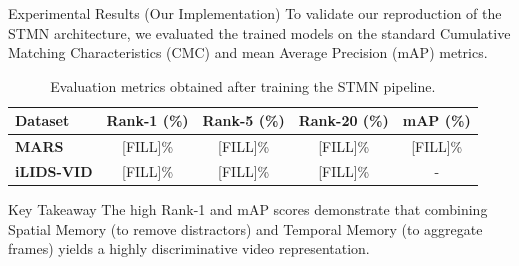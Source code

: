 \begin{frame}{Experimental Results (Our Implementation)}
    \small
    To validate our reproduction of the STMN architecture, we evaluated the trained models on the standard Cumulative Matching Characteristics (CMC) and mean Average Precision (mAP) metrics.
    
    \vspace{1em}
    \begin{table}[]
        \centering
        \renewcommand{\arraystretch}{1.3} %
        \begin{tabular}{@{}lcccc@{}}
            \toprule
            \textbf{Dataset} & \textbf{Rank-1 (\%)} & \textbf{Rank-5 (\%)} & \textbf{Rank-20 (\%)} & \textbf{mAP (\%)} \\
            \midrule
            \textbf{MARS} & [FILL]\% & [FILL]\% & [FILL]\% & [FILL]\% \\
            \textbf{iLIDS-VID} & [FILL]\% & [FILL]\% & [FILL]\% & - \\
            \bottomrule
        \end{tabular}
        \caption{Evaluation metrics obtained after training the STMN pipeline.}
    \end{table}

    \vspace{0.5em}
    \begin{block}{\small Key Takeaway}
        \small The high Rank-1 and mAP scores demonstrate that combining Spatial Memory (to remove distractors) and Temporal Memory (to aggregate frames) yields a highly discriminative video representation.
    \end{block}
\end{frame}
